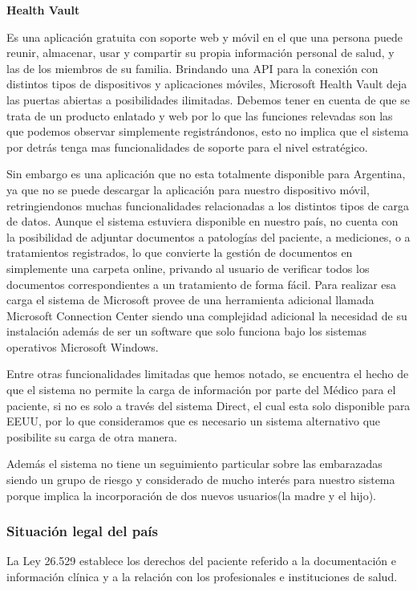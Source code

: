 \textbf{Health Vault}


	 Es una aplicación gratuita con soporte web y móvil en el que una persona puede reunir, almacenar, usar y compartir su propia información personal de salud, y las de los miembros de su familia. Brindando una API para la conexión con distintos tipos de dispositivos y aplicaciones móviles, Microsoft Health Vault deja las puertas abiertas a posibilidades ilimitadas. 
     Debemos tener en cuenta de que se trata de un producto enlatado y web por lo que las funciones relevadas son las que podemos observar simplemente registrándonos, esto no implica que el sistema por detrás tenga mas funcionalidades de soporte para el nivel estratégico.
     
     Sin embargo es una aplicación que no esta totalmente disponible para Argentina, ya que no se puede descargar la aplicación para nuestro dispositivo móvil, retringiendonos muchas funcionalidades relacionadas a los distintos tipos de carga de datos.
     Aunque el sistema estuviera disponible en nuestro país, no cuenta con la posibilidad de adjuntar documentos a patologías del paciente, a mediciones, o a tratamientos registrados, lo que convierte la gestión de documentos en simplemente una carpeta online, privando al usuario de verificar todos los documentos correspondientes a un tratamiento de forma fácil. Para realizar esa carga el sistema de Microsoft provee de una herramienta adicional llamada Microsoft Connection Center siendo una complejidad adicional la necesidad de su instalación además de ser un software que solo funciona bajo los sistemas operativos Microsoft Windows.
	
    Entre otras funcionalidades limitadas que hemos notado, se encuentra el hecho de que el sistema no permite la carga de información por parte del Médico para el paciente, si no es solo a través del sistema Direct, el cual esta solo disponible para EEUU, por lo que consideramos que es necesario un sistema alternativo que posibilite su carga de otra manera.
    
	Además el sistema no tiene un seguimiento particular sobre las embarazadas siendo un grupo de riesgo y considerado de mucho interés para nuestro sistema porque implica la incorporación de dos nuevos usuarios(la madre y el hijo).
     
\subsubsection{Situación legal del país}   
La Ley 26.529 establece los derechos del paciente referido a la documentación e información clínica y a la relación con los profesionales e instituciones de salud. 

